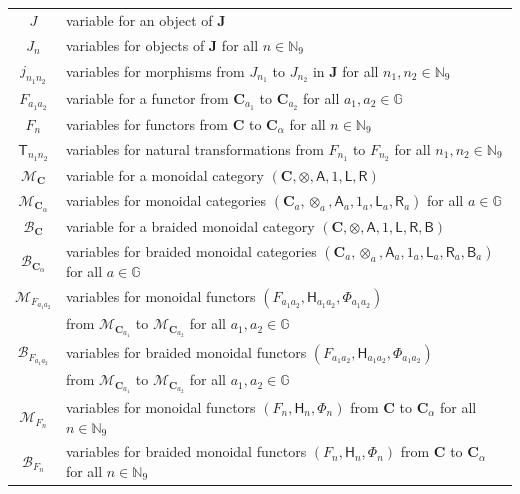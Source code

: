 \begin{longtable}{cl}
  \\[5pt]
  $J$
  &
  variable for an object of $\mathbf{J}$
  \\[5pt]
  $J_{n}$
  &
  variables for objects of $\mathbf{J}$ for all $n \in \mathbb{N}_{9}$
  \\[5pt]
  $j_{n_{1}n_{2}}$
  &
  variables for morphisms from $J_{n_{1}}$ to $J_{n_{2}}$ in
  $\mathbf{J}$ for all $n_{1},n_{2} \in \mathbb{N}_{9}$
  \\[5pt]
  $F_{a_{1}a_{2}}$
  &
  variable for a functor from $\mathbf{C}_{a_{1}}$ to $\mathbf{C}_{a_{2}}$
  for all $a_{1},a_{2} \in \mathbb{G}$
  \\[5pt]
  $F_{n}$
  &
  variables for functors from $\mathbf{C}$ to $\mathbf{C}_{\alpha}$
  for all $n \in \mathbb{N}_{9}$
  \\[5pt]
  $\mathsf{T}_{n_{1}n_{2}}$
  &
  variables for natural transformations from $F_{n_{1}}$ to $F_{n_{2}}$
  for all $n_{1},n_{2} \in \mathbb{N}_{9}$
  \\[5pt]
  $\mathcal{M}_{\mathbf{C}}$
  &
  variable for a monoidal category
  $(\mathbf{C},\otimes,\mathsf{A},1,\mathsf{L},\mathsf{R})$ 
  \\[5pt]
  $\mathcal{M}_{\mathbf{C}_{\alpha}}$
  &
  variables for monoidal categories
  $(\mathbf{C}_{a},\otimes_{a},\mathsf{A}_{a},1_{a},
  \mathsf{L}_{a},\mathsf{R}_{a})$
  for all $a \in \mathbb{G}$
  \\[5pt]
  $\mathcal{B}_{\mathbf{C}}$
  &
  variable for a braided monoidal category
  $(\mathbf{C},\otimes,\mathsf{A},1,\mathsf{L},\mathsf{R},\mathsf{B})$ 
  \\[5pt]
  $\mathcal{B}_{\mathbf{C}_{\alpha}}$
  &
  variables for braided monoidal categories
  $(\mathbf{C}_{a},\otimes_{a},\mathsf{A}_{a},1_{a},
  \mathsf{L}_{a},\mathsf{R}_{a},\mathsf{B}_{a})$
  for all $a \in \mathbb{G}$
  \\[5pt]
  $\mathcal{M}_{F_{a_{1}a_{2}}}$
  &
  variables for monoidal functors
  $(F_{a_{1}a_{2}},\mathsf{H}_{a_{1}a_{2}},\Phi_{a_{1}a_{2}})$
  \\
  $\phantom{\mathcal{M}_{F_{a_{1}a_{2}}}}$
  &
  from $\mathcal{M}_{\mathbf{C}_{a_{1}}}$ to $\mathcal{M}_{\mathbf{C}_{a_{2}}}$
  for all $a_{1},a_{2} \in \mathbb{G}$
  \\[5pt]
  $\mathcal{B}_{F_{a_{1}a_{2}}}$
  &
  variables for braided monoidal functors
  $(F_{a_{1}a_{2}},\mathsf{H}_{a_{1}a_{2}},\Phi_{a_{1}a_{2}})$
  \\
  $\phantom{\mathcal{B}_{F_{a_{1}a_{2}}}}$
  &
  from $\mathcal{M}_{\mathbf{C}_{a_{1}}}$ to $\mathcal{M}_{\mathbf{C}_{a_{2}}}$
  for all $a_{1},a_{2} \in \mathbb{G}$
  \\[5pt]
  $\mathcal{M}_{F_{n}}$
  &
  variables for monoidal functors $(F_{n},\mathsf{H}_{n},\Phi_{n})$
  from $\mathbf{C}$ to $\mathbf{C}_{\alpha}$ for all $n \in \mathbb{N}_{9}$
  \\[5pt]
  $\mathcal{B}_{F_{n}}$
  &
  variables for braided monoidal functors $(F_{n},\mathsf{H}_{n},\Phi_{n})$
  from $\mathbf{C}$ to $\mathbf{C}_{\alpha}$ for all $n \in \mathbb{N}_{9}$
  \\
  \hline
\end{longtable}
